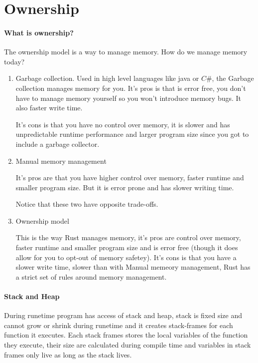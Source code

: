 \section{Ownership}
\paragraph*{What is ownership?}
The ownership model is a way to manage memory. How do we manage memory today?\begin{enumerate}
    \item Garbage collection.
Used in high level languages like java or $C\#$, the Garbage collection manages memory for you.
It's pros is that is error free, you don't have to manage memory yourself so you won't introduce memory bugs. It also faster write time.

It's cons is that you have no control over memory, it is slower and has unpredictable runtime performance and larger program size since you got to include a garbage collector.

    \item Manual memory management
    
It's pros are that you have higher control over memory, faster runtime and smaller program size. But it is error prone and has slower writing time.

Notice that these two have opposite trade-offs.

    \item Ownership model
    
This is the way Rust manages memory, it's pros are control over memory, faster runtime and smaller program size and is error free (though it does allow for you to opt-out of memory safetey).
It's cons is that you have a slower write time, slower than with Manual memeory management, Rust has a strict set of rules around memory management.
\end{enumerate}

\paragraph*{Stack and Heap}
During runetime program has access of stack and heap, stack is fixed size and cannot grow or shrink during runetime and it creates stack-frames for each function 
it executes. Each stack frames stores the local variables of the function they execute, their size are calculated during compile time and variables in stack frames 
only live as long as the stack lives.

